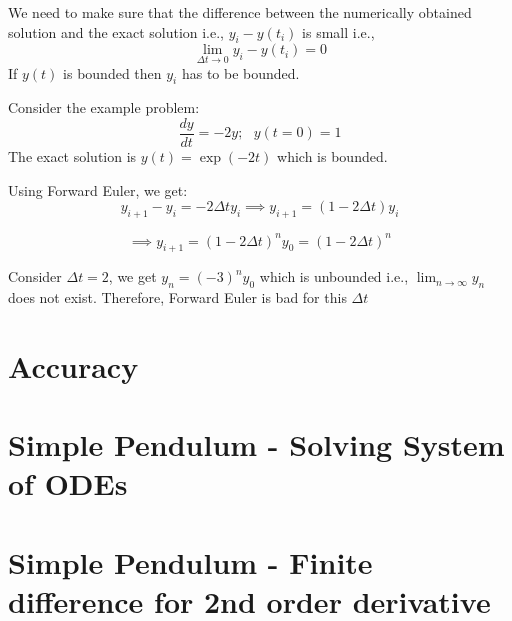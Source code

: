 \documentclass[
]{book}
\begin{document}
We need to make sure that the difference between the numerically obtained solution and the exact solution i.e., \(y_i-y(t_i)\) is small i.e., \[\lim_{\Delta t \to 0}y_i -y(t_i) = 0\] If \(y(t)\) is bounded then \(y_i\) has to be bounded.

Consider the example problem:
\[\frac{dy}{dt} = -2y; \ \ \ y(t=0)=1\]
The exact solution is \(y(t) = \exp(-2t)\) which is bounded.

Using Forward Euler, we get:
\begin{equation}
y_{i+1} -y_i = -2\Delta t y_i \implies y_{i+1}=(1-2\Delta t) y_i
\end{equation}

\begin{equation}
\implies y_{i+1} = (1-2\Delta t)^n y_0 = (1-2\Delta t)^n
\end{equation}

Consider \(\Delta t = 2\), we get \(y_n = (-3)^n y_0\) which is unbounded i.e., \(\lim_{n\to \infty} y_n\) does not exist. Therefore, Forward Euler is bad for this \(\Delta t\)

\hypertarget{accuracy}{%
\section{Accuracy}\label{accuracy}}

\hypertarget{simple-pendulum---solving-system-of-odes}{%
\section{Simple Pendulum - Solving System of ODEs}\label{simple-pendulum---solving-system-of-odes}}

\hypertarget{simple-pendulum---finite-difference-for-2nd-order-derivative}{%
\section{Simple Pendulum - Finite difference for 2nd order derivative}\label{simple-pendulum---finite-difference-for-2nd-order-derivative}}

  
\end{document}
